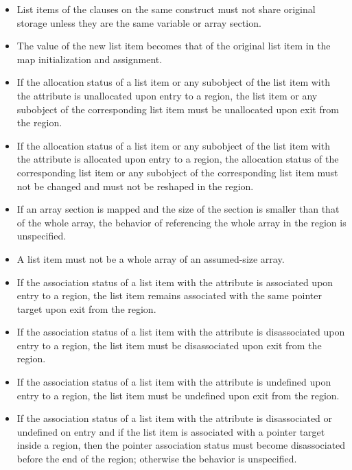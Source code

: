 \begin{fortranspecific}
\begin{itemize}
\item List items of the  clauses on the same construct must not share
original storage unless they are the same variable or array section.

\item The value of the new list item becomes that of the original list item in the map
initialization and assignment.

\item If the allocation status of a list item or any subobject of the
  list item with the  attribute is unallocated upon
  entry to a  region, the list item or any subobject of
  the corresponding list item must be unallocated upon exit from the
  region.

\item If the allocation status of a list item or any subobject of the
  list item with the  attribute is allocated upon
  entry to a  region, the allocation status of the
  corresponding list item or any subobject of the corresponding list
  item must not be changed and must not be reshaped in the region.

\item If an array section is mapped and the size of the section is
  smaller than that of the whole array, the behavior of referencing
  the whole array in the  region is unspecified.

\item A list item must not be a whole array of an assumed-size array.

\item If the association status of a list item with the 
  attribute is associated upon entry to a  region, the
  list item remains associated with the same pointer target upon exit
  from the region.

\item If the association status of a list item with the 
  attribute is disassociated upon entry to a  region, the
  list item must be disassociated upon exit from the region.

\item If the association status of a list item with the 
  attribute is undefined upon entry to a  region, the
  list item must be undefined upon exit from the region.

\item If the association status of a list item with the 
  attribute is disassociated or undefined on entry and if the list
  item is associated with a pointer target inside a 
  region, then the pointer association status must become
  disassociated before the end of the region; otherwise the behavior
  is unspecified.

\end{itemize}
\end{fortranspecific}

